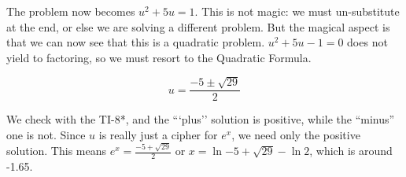 The problem now becomes $u^2+5u=1$.  This is not magic: we must un-substitute at the
end, or else we are solving a different problem.  But the magical aspect is that we can now
see that this is a quadratic problem.  $u^2+5u-1=0$ does not yield to factoring, so
we must resort to the Quadratic Formula.

$$
u=\frac{-5\pm\sqrt{29}}{2}
$$

We check with the TI-8*, and the ```plus'' solution is positive, while the ``minus'' one is not.
Since $u$ is really just a cipher for $e^x$, we need only the positive solution.  This means
$e^x=\frac{-5+\sqrt{29}}{2}$ or $x=\ln{-5+\sqrt{29}}-\ln{2}$, which is around -1.65.
